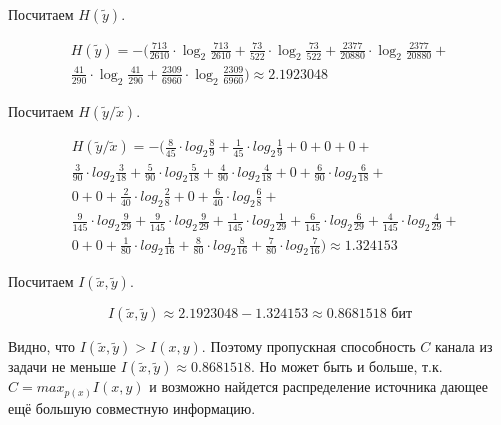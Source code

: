 \documentclass[a4paper,12pt]{article}
\begin{document}
Посчитаем $H(\tilde{y})$.

\begin{gather*}
H(\tilde{y}) = - \biggl( \frac{713}{2610} \cdot \log_2 \frac{713}{2610} + \frac{73}{522} \cdot \log_2 \frac{73}{522} + \frac{2377}{20880} \cdot \log_2 \frac{2377}{20880} + \\
\frac{41}{290} \cdot \log_2 \frac{41}{290} + \frac{2309}{6960} \cdot \log_2 \frac{2309}{6960} \biggr) \approx 2.1923048
\end{gather*}


\newpage

Посчитаем $H(\tilde{y} / \tilde{x})$.

\begin{align*}
& H(\tilde{y} / \tilde{x}) = - \biggl( \frac{8}{45} \cdot log_2 \frac{8}{9} + \frac{1}{45} \cdot log_2 \frac{1}{9} + 0 + 0 + 0 + \\
& \frac{3}{90} \cdot log_2 \frac{3}{18} + \frac{5}{90} \cdot log_2 \frac{5}{18} + \frac{4}{90} \cdot log_2 \frac{4}{18} + 0 + \frac{6}{90} \cdot log_2 \frac{6}{18} + \\
& 0 + 0 + \frac{2}{40} \cdot log_2 \frac{2}{8} + 0 + \frac{6}{40} \cdot log_2 \frac{6}{8} + \\
& \frac{9}{145} \cdot log_2 \frac{9}{29} + \frac{9}{145} \cdot log_2 \frac{9}{29} + \frac{1}{145} \cdot log_2 \frac{1}{29} + \frac{6}{145} \cdot log_2 \frac{6}{29} + \frac{4}{145} \cdot log_2 \frac{4}{29} + \\
& 0 + 0 + \frac{1}{80} \cdot log_2 \frac{1}{16} + \frac{8}{80} \cdot log_2 \frac{8}{16} + \frac{7}{80} \cdot log_2 \frac{7}{16} \biggr) \approx 1.324153
\end{align*}


Посчитаем $I(\tilde{x}, \tilde{y})$.

$$I(\tilde{x}, \tilde{y}) \approx 2.1923048 - 1.324153 \approx 0.8681518 \text{ бит}$$

Видно, что $I(\tilde{x}, \tilde{y}) > I(x, y)$.
Поэтому пропускная способность $C$ канала из задачи не меньше $I(\tilde{x}, \tilde{y}) \approx 0.8681518$. Но может быть и больше, т.к. $C = max_{p(x)} I(x, y)$ и возможно найдется распределение источника дающее ещё большую совместную информацию.
\end{document}
